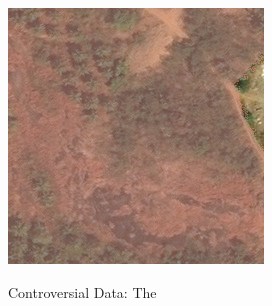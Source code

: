   \begin{figure}
    \begin{center}
    \label{badimg2}
    \includegraphics[width=.4\linewidth]{images/satellite_images/10_overlap}
    \caption{Controversial Data: The }
    \end{center}
  \end{figure}
